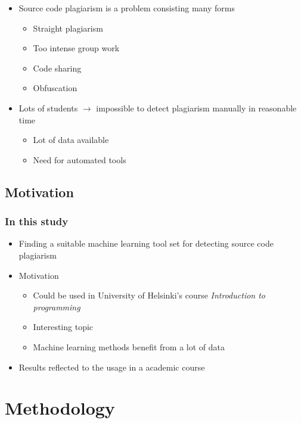 \documentclass[t,12pt,pdftex]{beamer}
\begin{document}
\begin{frame}
	\vspace{1in}
	\begin{itemize}
			\item Source code plagiarism is a problem consisting many forms
		\begin{itemize}
			\item Straight plagiarism
			\item Too intense group work 
			\item Code sharing
			\item Obfuscation
		\end{itemize}
		\item Lots of students $\rightarrow$ impossible to detect plagiarism manually in reasonable time
		\begin{itemize}
			\item Lot of data available
			\item Need for automated tools
		\end{itemize}
	\end{itemize}
\end{frame}

\subsection{Motivation}

\begin{frame}
	\frametitle{In this study}
	\begin{itemize}
		\item Finding a suitable machine learning tool set for detecting source code plagiarism
		\item Motivation
		\begin{itemize}
			\item Could be used in University of Helsinki's course \textit{Introduction to programming}
			\item Interesting topic
			\item Machine learning methods benefit from a lot of data
		\end{itemize}
		\item Results reflected to the usage in a academic course
	\end{itemize}
\end{frame}




\section{Methodology}
\end{document}

